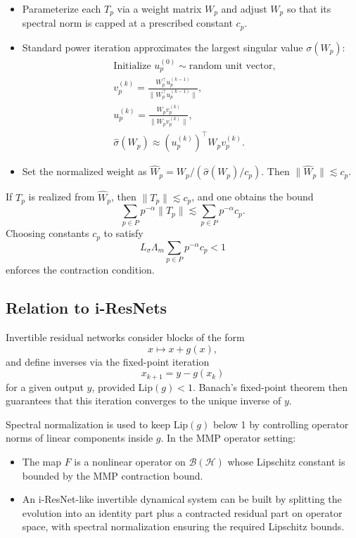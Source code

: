 \documentclass[12pt]{article}
\begin{document}
\begin{itemize}
  \item Parameterize each \(T_p\) via a weight matrix \(W_p\) and adjust \(W_p\) so that its spectral norm is capped at a prescribed constant \(c_p\).
  \item Standard power iteration approximates the largest singular value \(\sigma(W_p)\):
  \begin{align*}
    &\text{Initialize } u_p^{(0)} \sim \text{random unit vector}, \\
    &v_p^{(k)} = \frac{W_p^\top u_p^{(k-1)}}{\|W_p^\top u_p^{(k-1)}\|}, \\
    &u_p^{(k)} = \frac{W_p v_p^{(k)}}{\|W_p v_p^{(k)}\|}, \\
    &\hat{\sigma}(W_p) \approx (u_p^{(k)})^\top W_p v_p^{(k)}.
  \end{align*}
  \item Set the normalized weight as \(\hat{W}_p = W_p / (\hat{\sigma}(W_p)/c_p)\). Then \(\|\hat{W}_p\| \lesssim c_p\).
\end{itemize}

If \(T_p\) is realized from \(\hat{W}_p\), then \(\|T_p\| \lesssim c_p\), and one obtains the bound
\[
  \sum_{p\in P} p^{-\alpha} \|T_p\|
  \lesssim
  \sum_{p\in P} p^{-\alpha} c_p.
\]
Choosing constants \(c_p\) to satisfy
\[
  L_\sigma \Lambda_m \sum_{p\in P} p^{-\alpha} c_p < 1
\]
enforces the contraction condition.

\subsection{Relation to i-ResNets}

Invertible residual networks consider blocks of the form
\[
  x \mapsto x + g(x),
\]
and define inverses via the fixed-point iteration
\[
  x_{k+1} = y - g(x_k)
\]
for a given output \(y\), provided \(\mathrm{Lip}(g) < 1\). Banach's fixed-point theorem then guarantees that this iteration converges to the unique inverse of \(y\).

Spectral normalization is used to keep \(\mathrm{Lip}(g)\) below 1 by controlling operator norms of linear components inside \(g\). In the MMP operator setting:

\begin{itemize}
  \item The map \(F\) is a nonlinear operator on \(\mathcal{B}(\mathcal{H})\) whose Lipschitz constant is bounded by the MMP contraction bound.
  \item An i-ResNet-like invertible dynamical system can be built by splitting the evolution into an identity part plus a contracted residual part on operator space, with spectral normalization ensuring the required Lipschitz bounds.
\end{itemize}
\end{document}
